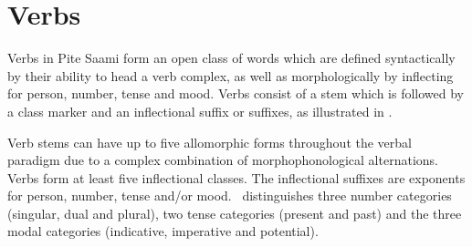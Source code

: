 

\chapter{Verbs}\label{verbs}
Verbs in Pite Saami form an open class of words which are defined syntactically by their ability to head a verb complex, as well as morphologically by inflecting for person, number, tense and mood. 
Verbs consist of a stem which is followed by a class marker and an inflectional suffix or suffixes, %
as illustrated in . %
\ea\label{verbStructure}%
\z


Verb stems can have up to five allomorphic forms throughout the verbal para\-digm due to a complex combination of morphophonological alternations. 
Verbs form at least five inflectional classes. 
The inflectional suffixes are exponents for person, number, tense and/or mood. 
\PS\ distinguishes three number categories (singular, dual and plural), two tense categories (present and past) and the three modal categories (indicative, imperative and potential). 


